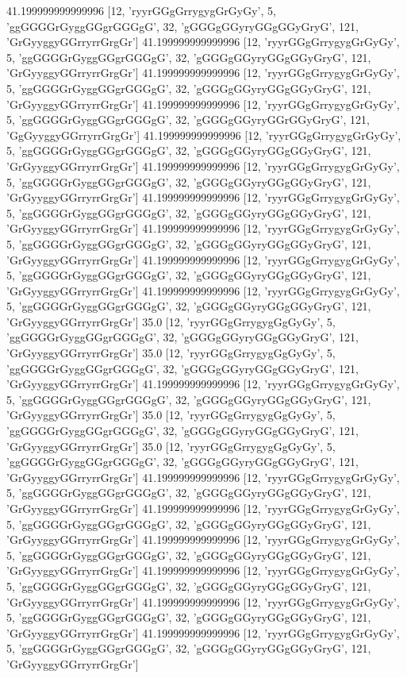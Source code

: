 41.199999999999996 [12, 'ryyrGGgGrrygygGrGyGy', 5, 'ggGGGGrGyggGGgrGGGgG', 32, 'gGGGgGGyryGGgGGyGryG', 121, 'GrGyyggyGGrryrrGrgGr']
41.199999999999996 [12, 'ryyrGGgGrrygygGrGyGy', 5, 'ggGGGGrGyggGGgrGGGgG', 32, 'gGGGgGGyryGGgGGyGryG', 121, 'GrGyyggyGGrryrrGrgGr']
41.199999999999996 [12, 'ryyrGGgGrrygygGrGyGy', 5, 'ggGGGGrGyggGGgrGGGgG', 32, 'gGGGgGGyryGGgGGyGryG', 121, 'GrGyyggyGGrryrrGrgGr']
41.199999999999996 [12, 'ryyrGGgGrrygygGrGyGy', 5, 'ggGGGGrGyggGGgrGGGgG', 32, 'gGGGgGGyryGGrGGyGryG', 121, 'GgGyyggyGGrryrrGrgGr']
41.199999999999996 [12, 'ryyrGGgGrrygygGrGyGy', 5, 'ggGGGGrGyggGGgrGGGgG', 32, 'gGGGgGGyryGGgGGyGryG', 121, 'GrGyyggyGGrryrrGrgGr']
41.199999999999996 [12, 'ryyrGGgGrrygygGrGyGy', 5, 'ggGGGGrGyggGGgrGGGgG', 32, 'gGGGgGGyryGGgGGyGryG', 121, 'GrGyyggyGGrryrrGrgGr']
41.199999999999996 [12, 'ryyrGGgGrrygygGrGyGy', 5, 'ggGGGGrGyggGGgrGGGgG', 32, 'gGGGgGGyryGGgGGyGryG', 121, 'GrGyyggyGGrryrrGrgGr']
41.199999999999996 [12, 'ryyrGGgGrrygygGrGyGy', 5, 'ggGGGGrGyggGGgrGGGgG', 32, 'gGGGgGGyryGGgGGyGryG', 121, 'GrGyyggyGGrryrrGrgGr']
41.199999999999996 [12, 'ryyrGGgGrrygygGrGyGy', 5, 'ggGGGGrGyggGGgrGGGgG', 32, 'gGGGgGGyryGGgGGyGryG', 121, 'GrGyyggyGGrryrrGrgGr']
41.199999999999996 [12, 'ryyrGGgGrrygygGrGyGy', 5, 'ggGGGGrGyggGGgrGGGgG', 32, 'gGGGgGGyryGGgGGyGryG', 121, 'GrGyyggyGGrryrrGrgGr']
35.0 [12, 'ryyrGGgGrrygygGgGyGy', 5, 'ggGGGGrGyggGGgrGGGgG', 32, 'gGGGgGGyryGGgGGyGryG', 121, 'GrGyyggyGGrryrrGrgGr']
35.0 [12, 'ryyrGGgGrrygygGgGyGy', 5, 'ggGGGGrGyggGGgrGGGgG', 32, 'gGGGgGGyryGGgGGyGryG', 121, 'GrGyyggyGGrryrrGrgGr']
41.199999999999996 [12, 'ryyrGGgGrrygygGrGyGy', 5, 'ggGGGGrGyggGGgrGGGgG', 32, 'gGGGgGGyryGGgGGyGryG', 121, 'GrGyyggyGGrryrrGrgGr']
35.0 [12, 'ryyrGGgGrrygygGgGyGy', 5, 'ggGGGGrGyggGGgrGGGgG', 32, 'gGGGgGGyryGGgGGyGryG', 121, 'GrGyyggyGGrryrrGrgGr']
35.0 [12, 'ryyrGGgGrrygygGgGyGy', 5, 'ggGGGGrGyggGGgrGGGgG', 32, 'gGGGgGGyryGGgGGyGryG', 121, 'GrGyyggyGGrryrrGrgGr']
41.199999999999996 [12, 'ryyrGGgGrrygygGrGyGy', 5, 'ggGGGGrGyggGGgrGGGgG', 32, 'gGGGgGGyryGGgGGyGryG', 121, 'GrGyyggyGGrryrrGrgGr']
41.199999999999996 [12, 'ryyrGGgGrrygygGrGyGy', 5, 'ggGGGGrGyggGGgrGGGgG', 32, 'gGGGgGGyryGGgGGyGryG', 121, 'GrGyyggyGGrryrrGrgGr']
41.199999999999996 [12, 'ryyrGGgGrrygygGrGyGy', 5, 'ggGGGGrGyggGGgrGGGgG', 32, 'gGGGgGGyryGGgGGyGryG', 121, 'GrGyyggyGGrryrrGrgGr']
41.199999999999996 [12, 'ryyrGGgGrrygygGrGyGy', 5, 'ggGGGGrGyggGGgrGGGgG', 32, 'gGGGgGGyryGGgGGyGryG', 121, 'GrGyyggyGGrryrrGrgGr']
41.199999999999996 [12, 'ryyrGGgGrrygygGrGyGy', 5, 'ggGGGGrGyggGGgrGGGgG', 32, 'gGGGgGGyryGGgGGyGryG', 121, 'GrGyyggyGGrryrrGrgGr']
41.199999999999996 [12, 'ryyrGGgGrrygygGrGyGy', 5, 'ggGGGGrGyggGGgrGGGgG', 32, 'gGGGgGGyryGGgGGyGryG', 121, 'GrGyyggyGGrryrrGrgGr']
